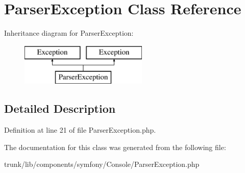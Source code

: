 \hypertarget{class_symfony_1_1_components_1_1_yaml_1_1_parser_exception}{
\section{ParserException Class Reference}
\label{class_symfony_1_1_components_1_1_yaml_1_1_parser_exception}
}
Inheritance diagram for ParserException:\begin{figure}[H]
\begin{center}
\leavevmode
\includegraphics[height=2.000000cm]{class_symfony_1_1_components_1_1_yaml_1_1_parser_exception}
\end{center}
\end{figure}


\subsection{Detailed Description}


Definition at line 21 of file ParserException.php.



The documentation for this class was generated from the following file:\begin{DoxyCompactItemize}
\item 
trunk/lib/components/symfony/Console/ParserException.php\end{DoxyCompactItemize}
